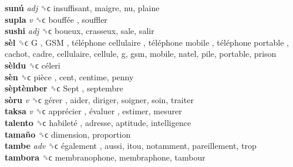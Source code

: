 \textbf{sunú} \emph{adj}  ␝ϲ  insuffisant, maigre, nu, plaine  \\
\textbf{supla} \emph{v}  ␝ϲ   bouffée , souffler  \\
\textbf{sushi} \emph{adj}  ␝ϲ  boueux, crasseux, sale, salir  \\
\textbf{sèl} ␝ϲ   G ,  GSM ,  téléphone cellulaire ,  téléphone mobile ,  téléphone portable , cachot, cadre, cellulaire, cellule, g, gsm, mobile, natel, pile, portable, prison  \\
\textbf{sèldu} ␝ϲ   céleri   \\
\textbf{sèn} ␝ϲ   pièce , cent, centime, penny  \\
\textbf{sèptèmber} ␝ϲ   Sept , septembre  \\
\textbf{sòru} \emph{v}  ␝ϲ   gérer , aider, diriger, soigner, soin, traiter  \\
\textbf{taksa} \emph{v}  ␝ϲ   apprécier ,  évaluer , estimer, mesurer  \\
\textbf{talento} ␝ϲ   habileté , adresse, aptitude, intelligence  \\
\textbf{tamaño} ␝ϲ  dimension, proportion  \\
\textbf{tambe} \emph{adv}  ␝ϲ   également , aussi, itou, notamment, pareillement, trop  \\
\textbf{tambora} ␝ϲ  membranophone, membraphone, tambour  \\

